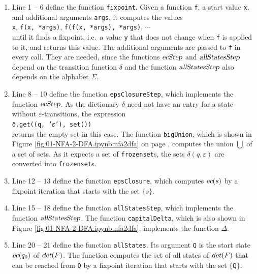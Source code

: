 \begin{enumerate}
\item Line 1 -- 6 define the function \texttt{fixpoint}.  Given a function \texttt{f}, a start value \texttt{x},
      and additional arguments \texttt{args}, it computes the values
      \\[0.2cm]
      \hspace*{1.3cm}
      \texttt{x}, \quad \texttt{f(x, *args)}, \quad \texttt{f(f(x, *args), *args)}, \quad $\cdots$
      \\[0.2cm]
      until it finds a fixpoint, i.e.~a value \texttt{y} that does not change when \texttt{f} is applied to it,
      and returns this value.  The additional arguments are passed to \texttt{f} in every call.  They are needed, since the functions
      $\textsl{ecStep}$ and $\textsl{allStatesStep}$ depend on the transition function $\delta$ and the function
      $\textsl{allStatesStep}$ also depends on the alphabet $\Sigma$.
\item Line 8 -- 10 define the function \texttt{epsClosureStep}, which implements the function $\textsl{ecStep}$.
      As the dictionary $\delta$ need not have an entry for a state without $\varepsilon$-transitions, the
      expression
      \\[0.2cm]
      \hspace*{1.3cm}
      \texttt{δ.get((q, '𝜀'), set())}
      \\[0.2cm]
      returns the empty set in this case.  The function \texttt{bigUnion}, which is shown in Figure
      \ref{fig:01-NFA-2-DFA.ipynb:nfa2dfa} on page \pageref{fig:01-NFA-2-DFA.ipynb:nfa2dfa}, computes the union
      $\bigcup$ of a set of sets.  As it expects a set of \texttt{frozenset}s, the sets $\delta(q, \varepsilon)$
      are converted into \texttt{frozenset}s.
\item Line 12 -- 13 define the function \texttt{epsClosure}, which computes $\textsl{ec}(s)$ by a fixpoint
      iteration that starts with the set $\{ s \}$.
\item Line 15 -- 18 define the function \texttt{allStatesStep}, which implements the function
      $\textsl{allStatesStep}$.  The function \texttt{capitalDelta}, which is also shown in Figure
      \ref{fig:01-NFA-2-DFA.ipynb:nfa2dfa}, implements the function $\Delta$.
\item Line 20 -- 21 define the function \texttt{allStates}.  Its argument \texttt{Q} is the start state
      $\textsl{ec}(q_0)$ of $\textsl{det}(F)$.  The function computes the set of all states of
      $\textsl{det}(F)$ that can be reached from \texttt{Q} by a fixpoint iteration that starts with the set
      $\{ \texttt{Q} \}$.
\end{enumerate}

